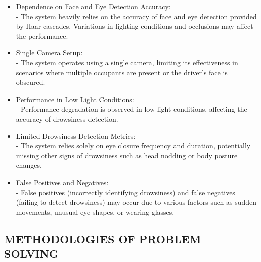 \documentclass[12pt]{article}
\begin{document}
\begin{itemize}
\item Dependence on Face and Eye Detection Accuracy:\\
   - The system heavily relies on the accuracy of face and eye detection provided by Haar cascades. Variations in lighting conditions and occlusions may affect the performance.

\item Single Camera Setup:\\
   - The system operates using a single camera, limiting its effectiveness in scenarios where multiple occupants are present or the driver's face is obscured.

\item Performance in Low Light Conditions:\\
   - Performance degradation is observed in low light conditions, affecting the accuracy of drowsiness detection.

\item Limited Drowsiness Detection Metrics:\\
   - The system relies solely on eye closure frequency and duration, potentially missing other signs of drowsiness such as head nodding or body posture changes.\

\item False Positives and Negatives:\\
   - False positives (incorrectly identifying drowsiness) and false negatives (failing to detect drowsiness) may occur due to various factors such as sudden movements, unusual eye shapes, or wearing glasses.
\end{itemize}

\subsection{METHODOLOGIES OF PROBLEM SOLVING}
\end{document}
